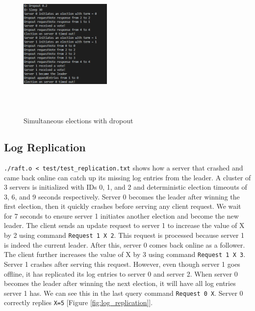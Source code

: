 \documentclass[letterpaper,twocolumn,10pt]{article}
\begin{document}
\begin{figure}[htb!]
\centering
\includegraphics[width=0.4\textwidth,height=75mm]{images/dropout_election.png}
\caption{Simultaneous elections with dropout}
\label{fig:dropout_election}
\end{figure}

\subsection{Log Replication}
\texttt{./raft.o < test/test\_replication.txt} shows how a server that crashed and came back online can catch up its missing log entries from the leader. A cluster of 3 servers is initialized with IDs 0, 1, and 2 and deterministic election timeouts of 3, 6, and 9 seconds respectively. Server 0 becomes the leader after winning the first election, then it quickly crashes before serving any client request. We wait for 7 seconds to ensure server 1 initiates another election and become the new leader. The client sends an update request to server 1 to increase the value of X by 2 using command \texttt{Request 1 X 2}. This request is processed because server 1 is indeed the current leader. After this, server 0 comes back online as a follower. The client further increases the value of X by 3 using command \texttt{Request 1 X 3}. Server 1 crashes after serving this request. However, even though server 1 goes offline, it has replicated its log entries to server 0 and server 2. When server 0 becomes the leader after winning the next election, it will have all log entries server 1 has. We can see this in the last query command \texttt{Request 0 X}. Server 0 correctly replies \texttt{X=5} [Figure \ref{fig:log_replication}].
\end{document}
